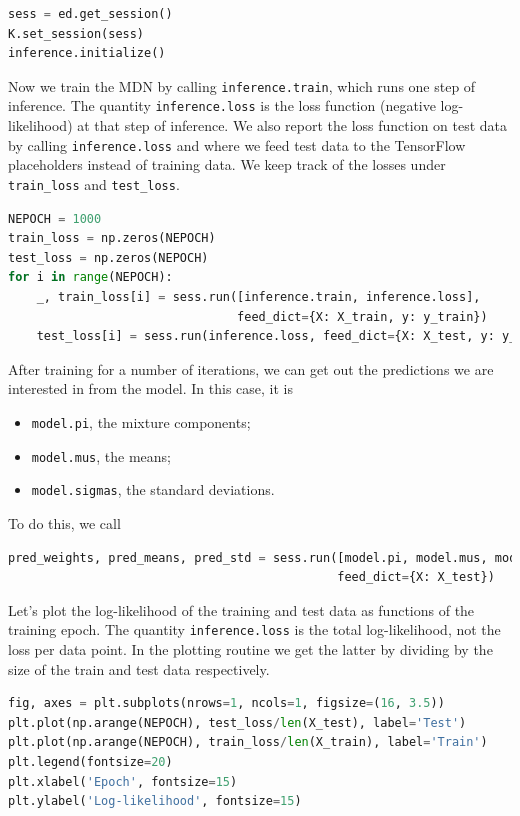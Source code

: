 \begin{lstlisting}[language=Python]
sess = ed.get_session()
K.set_session(sess)
inference.initialize()
\end{lstlisting}

Now we train the MDN by calling \texttt{inference.train}, which runs
one step of inference. The quantity \texttt{inference.loss} is the
loss function (negative log-likelihood) at that step of inference.  We
also report the loss function on test data by calling
\texttt{inference.loss} and where we feed test data to the TensorFlow
placeholders instead of training data.
We keep track of the losses under \texttt{train\_loss} and \texttt{test\_loss}.

\begin{lstlisting}[language=Python]
NEPOCH = 1000
train_loss = np.zeros(NEPOCH)
test_loss = np.zeros(NEPOCH)
for i in range(NEPOCH):
    _, train_loss[i] = sess.run([inference.train, inference.loss],
                                feed_dict={X: X_train, y: y_train})
    test_loss[i] = sess.run(inference.loss, feed_dict={X: X_test, y: y_test})
\end{lstlisting}

After training for a number of iterations,
we can get out the predictions we are interested in from
the model. In this case, it is

\begin{itemize}
\item
\texttt{model.pi}, the mixture components;
\item
\texttt{model.mus}, the means;
\item
\texttt{model.sigmas}, the standard deviations.
\end{itemize}

To do this, we call
\begin{lstlisting}[language=Python]
pred_weights, pred_means, pred_std = sess.run([model.pi, model.mus, model.sigmas],
                                              feed_dict={X: X_test})
\end{lstlisting}

Let's plot the log-likelihood of the training and test data as
functions of the training epoch. The quantity \texttt{inference.loss}
is the total log-likelihood, not the loss per data point.  In the
plotting routine we get the latter by dividing by the size of the
train and test data respectively.

\begin{lstlisting}[language=Python]
fig, axes = plt.subplots(nrows=1, ncols=1, figsize=(16, 3.5))
plt.plot(np.arange(NEPOCH), test_loss/len(X_test), label='Test')
plt.plot(np.arange(NEPOCH), train_loss/len(X_train), label='Train')
plt.legend(fontsize=20)
plt.xlabel('Epoch', fontsize=15)
plt.ylabel('Log-likelihood', fontsize=15)
\end{lstlisting}

